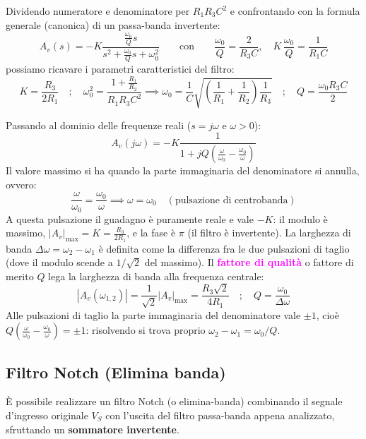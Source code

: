 Dividendo numeratore e denominatore per $R_1 R_3 C^2$ e confrontando con la formula generale (canonica) di un passa-banda invertente:
\[
A_v(s) = -K \frac{\frac{\omega_0}{Q}s}{s^2 + \frac{\omega_0}{Q}s + \omega_0^2}
\qquad\text{con}\qquad
\frac{\omega_0}{Q} = \frac{2}{R_3 C},\quad K\,\frac{\omega_0}{Q} = \frac{1}{R_1 C}
\]
possiamo ricavare i parametri caratteristici del filtro:
\[
K = \frac{R_3}{2R_1} \quad ; \quad \omega_0^2 = \frac{1 + \frac{R_1}{R_2}}{R_1 R_3 C^2} \implies \omega_0 = \frac{1}{C}\sqrt{\left(\frac{1}{R_1} + \frac{1}{R_2}\right)\frac{1}{R_3}} \quad ; \quad Q = \frac{\omega_0 R_3 C}{2}
\]

Passando al dominio delle frequenze reali ($s = j\omega$ e $\omega > 0$):
\[
A_v(j\omega) = -K \frac{1}{1 + jQ\left(\frac{\omega}{\omega_0} - \frac{\omega_0}{\omega}\right)}
\]
Il valore massimo si ha quando la parte immaginaria del denominatore si annulla, ovvero:
\[
\frac{\omega}{\omega_0} = \frac{\omega_0}{\omega} \implies \omega = \omega_0 \quad (\text{pulsazione di centrobanda})
\]
A questa pulsazione il guadagno è puramente reale e vale $-K$: il modulo è massimo, $|A_v|_{\max} = K = \frac{R_3}{2R_1}$, e la fase è $\pi$ (il filtro è invertente).
La larghezza di banda $\Delta\omega = \omega_2 - \omega_1$ è definita come la differenza fra le due pulsazioni di taglio (dove il modulo scende a $1/\sqrt{2}$ del massimo).
Il \textcolor{magenta}{\textbf{fattore di qualità}} o fattore di merito $Q$ lega la larghezza di banda alla frequenza centrale:
\[
|A_v(\omega_{1,2})| = \frac{1}{\sqrt{2}} |A_v|_{\max} = \frac{R_3 \sqrt{2}}{4 R_1} \quad ; \quad Q = \frac{\omega_0}{\Delta\omega}
\]
Alle pulsazioni di taglio la parte immaginaria del denominatore vale $\pm 1$, cioè $Q\left(\frac{\omega}{\omega_0} - \frac{\omega_0}{\omega}\right) = \pm 1$: risolvendo si trova proprio $\omega_2 - \omega_1 = \omega_0/Q$.


\subsection{Filtro Notch (Elimina banda)}

È possibile realizzare un filtro Notch (o elimina-banda) combinando il segnale d'ingresso originale $V_S$ con l'uscita del filtro passa-banda appena analizzato, sfruttando un \textbf{sommatore invertente}.

